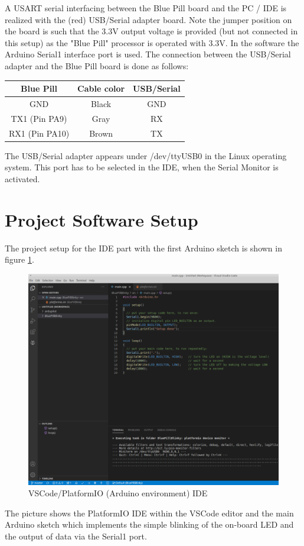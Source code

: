 \documentclass[11pt, oneside]{scrartcl}   	%
\begin{document}
A USART serial interfacing between the Blue Pill board and the PC / IDE is realized with the (red) USB/Serial adapter board.
Note the jumper position on the board is such that the 3.3V output voltage is provided (but not connected in this setup) as the "Blue
Pill" processor is operated with 3.3V. In the software the Arduino Serial1 interface port is used.
The connection between the USB/Serial adapter and the Blue Pill board is done as follows:
\begin{center}
\begin{tabular}{|c|c|c|}
	\hline
	\textbf{Blue Pill} & \textbf{Cable color} & \textbf{USB/Serial} \\
	\hline
	GND & Black & GND \\
	\hline
	TX1 (Pin PA9) & Gray & RX \\
	\hline
	RX1 (Pin PA10) & Brown & TX \\
	\hline
\end{tabular}
\end{center}
The USB/Serial adapter appears under /dev/ttyUSB0 in the Linux operating system. This port has to be selected in the IDE, when the Serial Monitor is activated.

\newpage
\section{Project Software Setup}
The project setup for the IDE part with the first Arduino sketch is shown in figure \ref{fig:IDESetup}.
\begin{figure}[htbp]
	\centering
	\includegraphics[width=1.0\linewidth]{Figures/VSCode+PlatformIO+SerialMonitor+Blinky.png}
	\caption{VSCode/PlatformIO (Arduino environment) IDE}
	\label{fig:IDESetup}
\end{figure}
The picture shows the PlatformIO IDE within the VSCode editor and the main Arduino sketch which implements the simple blinking of the on-board LED and the output of data via the Serial1 port.
\end{document}
